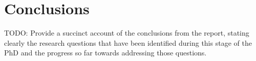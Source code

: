 \section{Conclusions}
TODO: Provide a succinct account of the conclusions from the report, stating clearly the research questions that have been identified during this stage of the PhD and the progress so far towards addressing those questions.